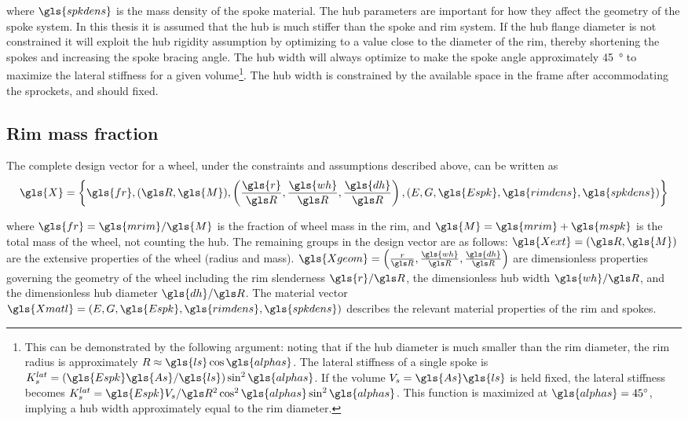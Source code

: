 \documentclass[\rootdir/thesis.tex]{subfiles}
\begin{document}
where $\gls{spkdens}$ is the mass density of the spoke material. The hub parameters are important for how they affect the geometry of the spoke system. In this thesis it is assumed that the hub is much stiffer than the spoke and rim system. If the hub flange diameter is not constrained it will exploit the hub rigidity assumption by optimizing to a value close to the diameter of the rim, thereby shortening the spokes and increasing the spoke bracing angle. The hub width will always optimize to make the spoke angle approximately \SI{45}{\degree} to maximize the lateral stiffness for a given volume\footnote{This can be demonstrated by the following argument: noting that if the hub diameter is much smaller than the rim diameter, the rim radius is approximately $R \approx \gls{ls} \cos{\gls{alphas}}$. The lateral stiffness of a single spoke is $K_s^{lat} = (\gls{Espk}\gls{As}/\gls{ls})\sin^2{\gls{alphas}}$. If the volume $V_s=\gls{As}\gls{ls}$ is held fixed, the lateral stiffness becomes $K_s^{lat} = \gls{Espk}V_s/\R^2 \cos^2{\gls{alphas}}\sin^2{\gls{alphas}}$. This function is maximized at $\gls{alphas}=\SI{45}{\degree}$, implying a hub width approximately equal to the rim diameter.}. The hub width is constrained by the available space in the frame after accommodating the sprockets, and should fixed.

\subsection{Rim mass fraction}

The complete design vector for a wheel, under the constraints and assumptions described above, can be written as
\begin{equation}
\label{eqn:design_vector}
\gls{X} = \left\lbrace \gls{fr}, (\R, \gls{M}), \left(\frac{\gls{r}}{\R}, \frac{\gls{wh}}{\R}, \frac{\gls{dh}}{\R}\right), (E, G, \gls{Espk}, \gls{rimdens}, \gls{spkdens}) \right\rbrace
\end{equation}

where $\gls{fr} = \gls{mrim}/\gls{M}$ is the fraction of wheel mass in the rim, and $\gls{M}=\gls{mrim} + \gls{mspk}$ is the total mass of the wheel, not counting the hub. The remaining groups in the design vector are as follows: $\gls{Xext}=(\R, \gls{M})$ are the extensive properties of the wheel (radius and mass). $\gls{Xgeom} = \left(\frac{r}{\R}, \frac{\gls{wh}}{\R}, \frac{\gls{dh}}{\R}\right)$ are dimensionless properties governing the geometry of the wheel including the rim slenderness $\gls{r}/\R$, the dimensionless hub width $\gls{wh}/\R$, and the dimensionless hub diameter $\gls{dh}/\R$. The material vector $\gls{Xmatl}= (\E, \G, \gls{Espk}, \gls{rimdens}, \gls{spkdens})$ describes the relevant material properties of the rim and spokes.
\end{document}
